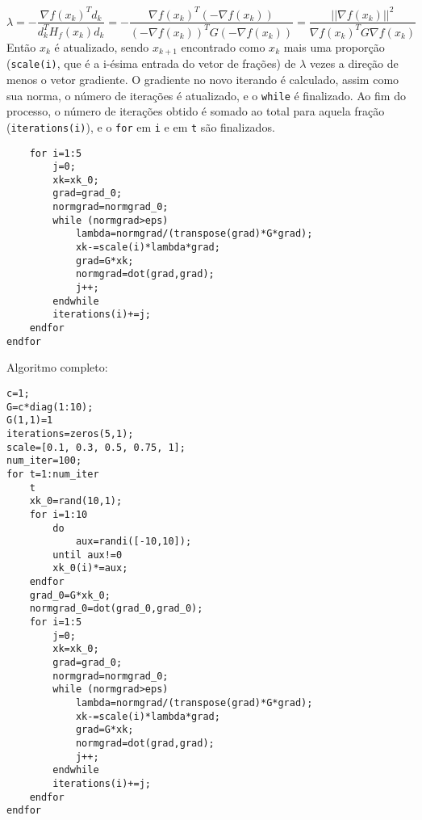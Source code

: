 \documentclass[a4paper, 12pt]{article}
\begin{document}
\[
\lambda=-\frac{\nabla f(x_k)^Td_k}{d_k^TH_f(x_k)d_k}=-\frac{\nabla f(x_k)^T(-\nabla f(x_k))}{(-\nabla f(x_k))^TG(-\nabla f(x_k))}=\frac{||\nabla f(x_k)||^2}{\nabla f(x_k)^TG\nabla f(x_k)}
\]
Então $x_k$ é atualizado, sendo $x_{k+1}$ encontrado como $x_k$ mais uma proporção (\verb+scale(i)+, que é a i-ésima entrada do vetor de frações) de $\lambda$ vezes a direção de menos o vetor gradiente. O gradiente no novo iterando é calculado, assim como sua norma, o número de iterações é atualizado, e o \verb+while+ é finalizado. Ao fim do processo, o número de iterações obtido é somado ao total para aquela fração (\verb+iterations(i)+), e o \verb+for+ em \verb+i+ e em \verb+t+ são finalizados.
\begin{lstlisting}
    for i=1:5
        j=0;
        xk=xk_0;
        grad=grad_0;
        normgrad=normgrad_0;
        while (normgrad>eps)
            lambda=normgrad/(transpose(grad)*G*grad);
            xk-=scale(i)*lambda*grad;
            grad=G*xk;
            normgrad=dot(grad,grad);
            j++;
        endwhile
        iterations(i)+=j;
    endfor
endfor
\end{lstlisting}
Algoritmo completo:
\begin{lstlisting}
c=1;
G=c*diag(1:10);
G(1,1)=1
iterations=zeros(5,1);
scale=[0.1, 0.3, 0.5, 0.75, 1];
num_iter=100;
for t=1:num_iter
    t
    xk_0=rand(10,1);
    for i=1:10
        do
            aux=randi([-10,10]);
        until aux!=0
        xk_0(i)*=aux;
    endfor
    grad_0=G*xk_0;
    normgrad_0=dot(grad_0,grad_0);
    for i=1:5
        j=0;
        xk=xk_0;
        grad=grad_0;
        normgrad=normgrad_0;
        while (normgrad>eps)
            lambda=normgrad/(transpose(grad)*G*grad);
            xk-=scale(i)*lambda*grad;
            grad=G*xk;
            normgrad=dot(grad,grad);
            j++;
        endwhile
        iterations(i)+=j;
    endfor
endfor
\end{lstlisting}
\end{document}
